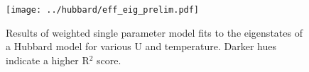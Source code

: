 \documentclass{article}
\begin{document}
\begin{figure}[H]
\centering
\texttt{[image: ../hubbard/eff\_eig\_prelim.pdf]}
\caption{Results of weighted single parameter model fits to the eigenstates of a Hubbard model for various U and temperature. Darker hues indicate a higher R$^2$ score.}
\label{fig:Hubbard}
\end{figure}	
\end{document}
